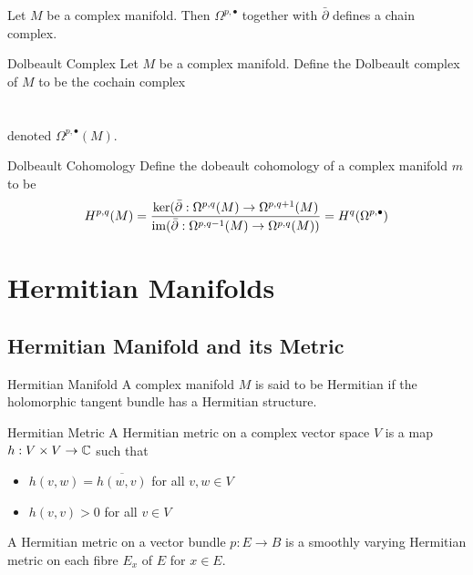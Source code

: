 \documentclass[a4paper]{article}
\begin{document}
\begin{prp}{}{} Let $M$ be a complex manifold. Then $\Omega^{p,\bullet}$ together with $\bar{\partial}$ defines a chain complex. 
\end{prp}

\begin{defn}{Dolbeault Complex}{} Let $M$ be a complex manifold. Define the Dolbeault complex of $M$ to be the cochain complex \\~\\
~\\
denoted $\Omega^{p,\bullet}(M)$. 
\end{defn}

\begin{defn}{Dolbeault Cohomology}{} Define the dobeault cohomology of a complex manifold $m$ to be $$H^{p,q}(M)=\frac{\ker(\bar{\partial}:\Omega^{p,q}(M)\to\Omega^{p,q+1}(M)}{\operatorname{im}(\bar{\partial}:\Omega^{p,q-1}(M)\to\Omega^{p,q}(M))}=H^q(\Omega^{p,\bullet})$$
\end{defn}

\pagebreak
\section{Hermitian Manifolds}
\subsection{Hermitian Manifold and its Metric}
\begin{defn}{Hermitian Manifold}{} A complex manifold $M$ is said to be Hermitian if the holomorphic tangent bundle has a Hermitian structure. 
\end{defn}

\begin{defn}{Hermitian Metric}{} A Hermitian metric on a complex vector space $V$ is a map $h:V\times V\to\mathbb{C}$ such that 
\begin{itemize}
\item $h(v,w)=\overline{h(w,v)}$ for all $v,w\in V$
\item $h(v,v)>0$ for all $v\in V$
\end{itemize}
A Hermitian metric on a vector bundle $p:E\to B$ is a smoothly varying Hermitian metric on each fibre $E_x$ of $E$ for $x\in E$. 
\end{defn}
\end{document}

